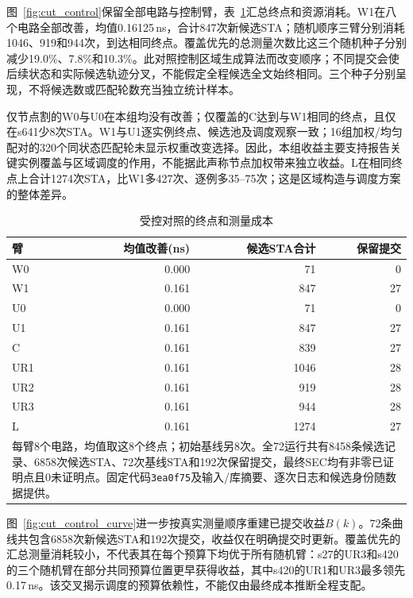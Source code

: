\documentclass[twocolumn,10pt,fontset=windows]{ctexart}
\begin{document}
图~\ref{fig:cut_control}保留全部电路与控制臂，表~\ref{tab:cut_control_summary}汇总终点和资源消耗。W1在八个电路全部改善，均值0.16125\,ns，合计847次新候选STA；随机顺序三臂分别消耗1046、919和944次，到达相同终点。覆盖优先的总测量次数比这三个随机种子分别减少19.0\%、7.8\%和10.3\%。此对照控制区域生成算法而改变顺序；不同提交会使后续状态和实际候选轨迹分叉，不能假定全程候选全文始终相同。三个种子分别呈现，不将候选数或匹配轮数充当独立统计样本。

仅节点割的W0与U0在本组均没有改善；仅覆盖的C达到与W1相同的终点，且仅在s641少8次STA。W1与U1逐实例终点、候选池及调度观察一致；16组加权/均匀配对的320个同状态匹配轮未显示权重改变选择。因此，本组收益主要支持报告关键实例覆盖与区域调度的作用，不能据此声称节点加权带来独立收益。L在相同终点上合计1274次STA，比W1多427次、逐例多35--75次；这是区域构造与调度方案的整体差异。

\begin{table}[htbp]
\centering\caption{受控对照的终点和测量成本}\label{tab:cut_control_summary}
\footnotesize\setlength{\tabcolsep}{3pt}
\begin{tabular}{lrrr}
\toprule
\textbf{臂} & \textbf{均值改善(ns)} & \textbf{候选STA合计} & \textbf{保留提交}\\
\midrule
W0 & 0.000 & 71 & 0 \\
W1 & 0.161 & 847 & 27 \\
U0 & 0.000 & 71 & 0 \\
U1 & 0.161 & 847 & 27 \\
C & 0.161 & 839 & 27 \\
UR1 & 0.161 & 1046 & 28 \\
UR2 & 0.161 & 919 & 28 \\
UR3 & 0.161 & 944 & 28 \\
L & 0.161 & 1274 & 27 \\
\bottomrule
\multicolumn{4}{p{0.93\columnwidth}}{\footnotesize 每臂8个电路，均值取这8个终点；初始基线另8次。全72运行共有8458条候选记录、6858次候选STA、72次基线STA和192次保留提交，最终SEC均有非零已证明点且0未证明点。固定代码\texttt{3ea0f75}及输入/库摘要、逐次日志和候选身份随数据提供。}\\
\end{tabular}
\end{table}

图~\ref{fig:cut_control_curve}进一步按真实测量顺序重建已提交收益$B(k)$。72条曲线共包含6858次新候选STA和192次提交，收益仅在明确提交时更新。覆盖优先的汇总测量消耗较小，不代表其在每个预算下均优于所有随机臂：s27的UR3和s420的三个随机臂在部分共同预算位置更早获得收益，其中s420的UR1和UR3最多领先0.17\,ns。该交叉揭示调度的预算依赖性，不能仅由最终成本推断全程支配。
\end{document}
